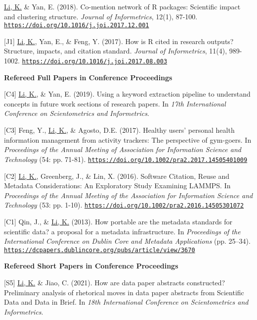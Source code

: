 \documentclass[margin, 10pt]{res} %
\begin{document}
\begin{resume}
[J2] \underline{Li, K.} \& Yan, E. (2018). Co-mention network of R packages: Scientific impact and clustering structure. \textit{Journal of Informetrics}, 12(1), 87-100. \href{https://doi.org/10.1016/j.joi.2017.12.001}{\nolinkurl{https://doi.org/10.1016/j.joi.2017.12.001}}

[J1] \underline{Li, K.}, Yan, E., \& Feng, Y. (2017). How is R cited in research outputs? Structure, impacts, and citation standard. \textit{Journal of Informetrics}, 11(4), 989-1002. \href{https://doi.org/10.1016/j.joi.2017.08.003}{\nolinkurl{https://doi.org/10.1016/j.joi.2017.08.003}}

\textbf{Refereed Full Papers in Conference Proceedings}

[C4] \underline{Li, K.}, \& Yan, E. (2019). Using a keyword extraction pipeline to understand concepts in future work sections of research papers. In \textit{17th International Conference on Scientometrics and Informetrics}.

[C3] Feng, Y., \underline{Li, K.}, \& Agosto, D.E. (2017). Healthy users’ personal health information management from activity trackers: The perspective of gym-goers. In \textit{Proceedings of the Annual Meeting of Association for Information Science and Technology} (54: pp. 71-81). \href{https://doi.org/10.1002/pra2.2017.14505401009}{\nolinkurl{https://doi.org/10.1002/pra2.2017.14505401009}}

[C2] \underline{Li, K.}, Greenberg, J., \& Lin, X. (2016). Software Citation, Reuse and Metadata Considerations: An Exploratory Study Examining LAMMPS. In \textit{Proceedings of the Annual Meeting of the Association for Information Science and Technology} (53: pp. 1-10). \href{https://doi.org/10.1002/pra2.2016.14505301072}{\nolinkurl{https://doi.org/10.1002/pra2.2016.14505301072}}

[C1] Qin, J., \& \underline{Li, K.} (2013). How portable are the metadata standards for scientific data? a proposal for a metadata infrastructure. In \textit{Proceedings of the International Conference on Dublin Core and Metadata Applications} (pp. 25–34). \href{https://dcpapers.dublincore.org/pubs/article/view/3670}{\nolinkurl{https://dcpapers.dublincore.org/pubs/article/view/3670}}

\textbf{Refereed Short Papers in Conference Proceedings}

[S5] \underline{Li, K.} \& Jiao, C. (2021). How are data paper abstracts constructed? Preliminary analysis of rhetorical moves in data paper abstracts from Scientific Data and Data in Brief. In \textit{18th International Conference on Scientometrics and Informetrics}.


\end{resume}
\end{document}
